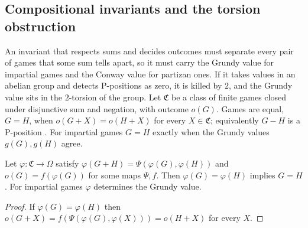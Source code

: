 \documentclass[final]{siamart0516}
\numberwithin{theorem}{section}
\numberwithin{equation}{section}
\theoremstyle{siamnonum}
\theoremstyle{plain}
\begin{document}
\subsection{Compositional invariants and the torsion obstruction}\label{ssec:torsion}
An invariant that respects sums and decides outcomes must separate every pair of games that some sum tells apart, so it must carry the Grundy value for impartial games and the Conway value for partizan ones. If it takes values in an abelian group and detects P-positions as zero, it is killed by $2$, and the Grundy value sits in the $2$-torsion of the group. Let $\mathfrak C$ be a class of finite games closed under disjunctive sum and negation, with outcome $o(G)$. Games are equal, $G=H$, when $o(G+X)=o(H+X)$ for every $X\in\mathfrak C$; equivalently $G-H$ is a P-position \cite{Siegel}. For impartial games $G=H$ exactly when the Grundy values $g(G),g(H)$ agree.

\begin{theorem}\label{thm:compositional}
Let $\varphi\colon\mathfrak C\to\Omega$ satisfy $\varphi(G+H)=\Psi(\varphi(G),\varphi(H))$ and $o(G)=f(\varphi(G))$ for some maps $\Psi,f$. Then $\varphi(G)=\varphi(H)$ implies $G=H$. For impartial games $\varphi$ determines the Grundy value.
\end{theorem}
\begin{proof}
If $\varphi(G)=\varphi(H)$ then $o(G+X)=f(\Psi(\varphi(G),\varphi(X)))=o(H+X)$ for every $X$.
\end{proof}
\end{document}
